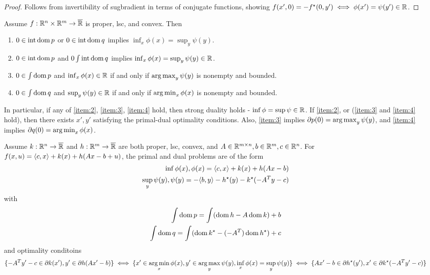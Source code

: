 \begin{proof}
  Follows from invertibility of sugbradient in terms of conjugate
  functions, showing $f(x', 0) = -f^{\star}(0, y') \iff \phi(x') =
  \psi(y') \in \mathbb{R}$.
\end{proof}

\begin{thm}
  \label{sec:duality-optimization-6}
  Assume $f: \mathbb{R}^{n} \times \mathbb{R}^{m} \rightarrow \overline {\mathbb{R}}$ is proper,
  lsc, and convex. Then
  \begin{enumerate}
  \item\label{item:1} $0 \in \operatorname*{int} \operatorname*{dom} p$ or $0 \in \operatorname*{int} \operatorname*{dom} q$ implies
    $\inf_{x} \phi(x) = \sup_{y} \psi(y)$.
  \item\label{item:2} $0 \in \operatorname*{int} \operatorname*{dom} p$ and $0 \int \operatorname*{int} \operatorname*{dom} q$ implies
    $\inf_{x} \phi(x) = \sup_{y} \psi(y) \in \mathbb{R}$.
  \item\label{item:3} $0 \in \int \operatorname*{dom} p$ and $\inf_{x} \phi(x) \in \mathbb{R}$ if and only
    if $\operatorname*{arg\,max}_{y} \psi(y)$ is nonempty and bounded.
  \item\label{item:4} $0 \in \int \operatorname*{dom} q$ and $\sup_{y} \psi(y) \in \mathbb{R}$ if and only
    if $\operatorname*{arg\,min}_{x} \phi(x)$ is nonempty and bounded.
  \end{enumerate}
  In particular, if any of \ref{item:2}, \ref{item:3}, \ref{item:4}
  hold, then strong duality holds - $\inf \phi = \sup \psi \in \mathbb{R}$.
  If \ref{item:2}, or (\ref{item:3} and \ref{item:4} hold), then there
  exists $x', y'$ satisfying the primal-dual optimality conditions.
  Also, \ref{item:3} implies $\partial p(0) = \operatorname*{arg\,max}_{y} \psi(y)$,
  and \ref{item:4} implies $\partial q(0) = \operatorname*{arg\,min}_{x} \phi(x)$.
\end{thm}

\begin{thm}
  \label{sec:duality-optimization-7}
  Assume $k: \mathbb{R}^{n} \rightarrow \overline {\mathbb{R}}$ and $h: \mathbb{R}^{m}
  \rightarrow \overline {\mathbb{R}}$ are both proper, lsc, convex, and $A \in
  \mathbb{R}^{m \times n}, b \in \mathbb{R}^{m}, c \in \mathbb{R}^{n}$.  For $f(x, u) = \IP{c,
  x} + k(x) + h(Ax - b + u)$, the primal and dual problems are of the
form
\begin{align}
  \label{eq:43}
  \inf \phi(x), \phi(x) = \IP{c, x} + k(x) + h(Ax - b) \\
  \label{eq:44}
  \sup_{y} \psi(y), \psi(y) = -\IP{b, y} - h^{\star}(y) -
  k^{\star}(-A^{T}y - c)
\end{align} with
\begin{align}
  \label{eq:45}
  \int \operatorname*{dom} p = \int (\operatorname*{dom} h - A \operatorname*{dom} k) + b \\
  \label{eq:46}
  \int \operatorname*{dom} q = \int(\operatorname*{dom} k^{\star} - (-A^{T}) \operatorname*{dom} h^{\star}) + c
\end{align}
and optimality conditoins
\begin{align}
  \label{eq:47}
  \{ -A^{T} y' - c \in \partial k(x'), y' \in \partial h(Ax' - b) \}
  \iff \{ x' \in \operatorname*{arg\,min}_{x} \phi(x), y' \in \operatorname*{arg\,max}_{y} \psi(y),
  \inf_{x} \phi(x) = \sup_{y} \psi(y) \} \iff \{ Ax' - b \in \partial
  h^{\star}(y'), x' \in \partial k^{\star}(-A^{T} y' - c) \}
\end{align}
\end{thm}


